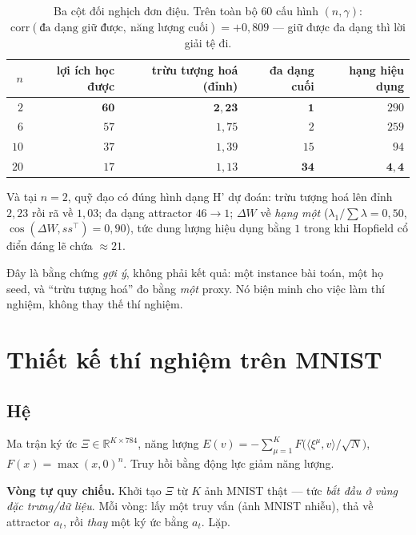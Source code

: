 \documentclass[11pt,a4paper]{article}
\newcommand{\yn}[1]{\par\vspace{1.5mm}\noindent\colorbox{boxbg}{\parbox{0.965\textwidth}{\vspace{1.2mm}#1\vspace{1.2mm}}}\vspace{1.5mm}}
\begin{document}
\begin{table}[h]\centering\small
\begin{tabular}{rrrrr}
\toprule
$n$ & lợi ích học được & trừu tượng hoá (đỉnh) & đa dạng cuối & hạng hiệu dụng\\
\midrule
$2$  & $\mathbf{60}$ & $\mathbf{2{,}23}$ & $\mathbf{1}$ & $290$\\
$6$  & $57$ & $1{,}75$ & $2$ & $259$\\
$10$ & $37$ & $1{,}39$ & $15$ & $94$\\
$20$ & $17$ & $1{,}13$ & $\mathbf{34}$ & $\mathbf{4{,}4}$\\
\bottomrule
\end{tabular}
\caption{Ba cột đối nghịch đơn điệu. Trên toàn bộ $60$ cấu hình $(n,\gamma)$:
$\mathrm{corr}(\text{đa dạng giữ được},\ \text{năng lượng cuối}) = +0{,}809$ ---
giữ được đa dạng thì lời giải tệ đi.}
\end{table}

Và tại $n=2$, quỹ đạo có đúng hình dạng H' dự đoán: trừu tượng hoá lên đỉnh
$2{,}23$ rồi rã về $1{,}03$; đa dạng attractor $46\to1$; $\Delta W$ về
\emph{hạng một} ($\lambda_1/\sum\lambda=0{,}50$,
$\cos(\Delta W,ss^{\!\top})=0{,}90$), tức dung lượng hiệu dụng bằng $1$ trong
khi Hopfield cổ điển đáng lẽ chứa $\approx 21$.

\yn{Đây là bằng chứng \emph{gợi ý}, không phải kết quả: một instance bài toán,
một họ seed, và ``trừu tượng hoá'' đo bằng \emph{một} proxy. Nó biện minh cho
việc làm thí nghiệm, không thay thế thí nghiệm.}

\section{Thiết kế thí nghiệm trên MNIST}

\subsection{Hệ}

Ma trận ký ức $\Xi\in\mathbb{R}^{K\times 784}$, năng lượng
$E(v) = -\sum_{\mu=1}^{K} F\big(\langle\xi^\mu,v\rangle/\sqrt{N}\big)$,
$F(x)=\max(x,0)^n$. Truy hồi bằng động lực giảm năng lượng.

\textbf{Vòng tự quy chiếu.} Khởi tạo $\Xi$ từ $K$ ảnh MNIST thật --- tức
\emph{bắt đầu ở vùng đặc trưng/dữ liệu}. Mỗi vòng: lấy một truy vấn (ảnh MNIST
nhiễu), thả về attractor $a_t$, rồi \emph{thay} một ký ức bằng $a_t$. Lặp.
\end{document}
